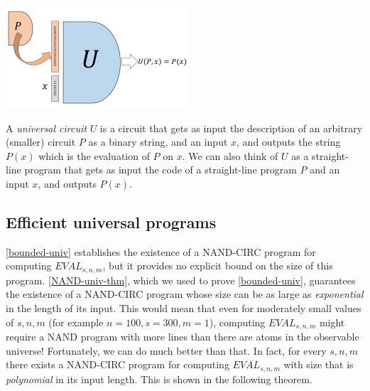 \begin{marginfigure}
\centering
\includegraphics[width=\linewidth, height=1.5in, keepaspectratio]{../figure/universalcircuit.png}
\caption{A \emph{universal circuit} \(U\) is a circuit that gets as
input the description of an arbitrary (smaller) circuit \(P\) as a
binary string, and an input \(x\), and outputs the string \(P(x)\) which
is the evaluation of \(P\) on \(x\). We can also think of \(U\) as a
straight-line program that gets as input the code of a straight-line
program \(P\) and an input \(x\), and outputs \(P(x)\).}
\label{universalcircfig}
\end{marginfigure}

\subsection{Efficient universal
programs}\label{Efficient-universal-progr}

\cref{bounded-univ} establishes the existence of a NAND-CIRC program for
computing \(\ensuremath{\mathit{EVAL}}_{s,n,m}\), but it provides no
explicit bound on the size of this program. \cref{NAND-univ-thm}, which
we used to prove \cref{bounded-univ}, guarantees the existence of a
NAND-CIRC program whose size can be as large as \emph{exponential} in
the length of its input. This would mean that even for moderately small
values of \(s,n,m\) (for example \(n=100,s=300,m=1\)), computing
\(\ensuremath{\mathit{EVAL}}_{s,n,m}\) might require a NAND program with
more lines than there are atoms in the observable universe! Fortunately,
we can do much better than that. In fact, for every \(s,n,m\) there
exists a NAND-CIRC program for computing
\(\ensuremath{\mathit{EVAL}}_{s,n,m}\) with size that is
\emph{polynomial} in its input length. This is shown in the following
theorem.

\hypertarget{eff-bounded-univ}{}

